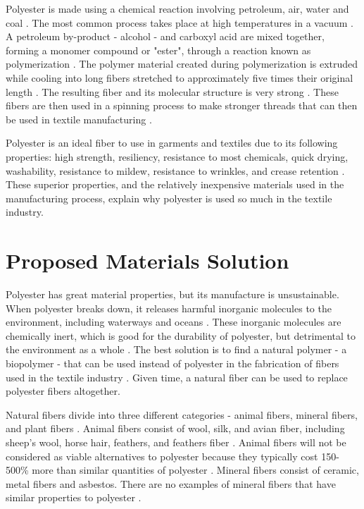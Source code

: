 \documentclass{article}
\begin{document}
Polyester is made using a chemical reaction involving petroleum, air, water and coal \autocite{craftechindustries}. The most common process takes place at high temperatures in a vacuum \autocite{craftechindustries}. A petroleum by-product - alcohol - and carboxyl acid are mixed together, forming a monomer compound or "ester", through a reaction known as polymerization \autocite{polyesterstrength}. The polymer material created during polymerization is extruded while cooling into long fibers stretched to approximately five times their original length \autocite{craftechindustries}. The resulting fiber and its molecular structure is very strong \autocite{polyesterstrength}. These fibers are then used in a spinning process to make stronger threads that can then be used in textile manufacturing \autocite{craftechindustries}.

Polyester is an ideal fiber to use in garments and textiles due to its following properties: high strength, resiliency, resistance to most chemicals, quick drying, washability, resistance to mildew, resistance to wrinkles, and crease retention \autocite{craftechindustries}. These superior properties, and the relatively inexpensive materials used in the manufacturing process, explain why polyester is used so much in the textile industry.

\section{Proposed Materials Solution}

Polyester has great material properties, but its manufacture is unsustainable. When polyester breaks down, it releases harmful inorganic molecules to the environment, including waterways and oceans \autocite{wastewaterbangladesh}. These inorganic molecules are chemically inert, which is good for the durability of polyester, but detrimental to the environment as a whole \autocite{polyesterstrength}\autocite{gesamp}. The best solution is to find a natural polymer - a biopolymer - that can be used instead of polyester in the fabrication of fibers used in the textile industry \autocite{gesamp}. Given time, a natural fiber can be used to replace polyester fibers altogether.

Natural fibers divide into three different categories - animal fibers, mineral fibers, and plant fibers \autocite{naturalfiberreview}. Animal fibers consist of wool, silk, and avian fiber, including sheep's wool, horse hair, feathers, and feathers fiber \autocite{naturalfiberreview}. Animal fibers will not be considered as viable alternatives to polyester because they typically cost 150-500\% more than similar quantities of polyester \autocite{naturalfiberreview}. Mineral fibers consist of ceramic, metal fibers and asbestos. There are no examples of mineral fibers that have similar properties to polyester \autocite{naturalfiberreview}. 
\end{document}
